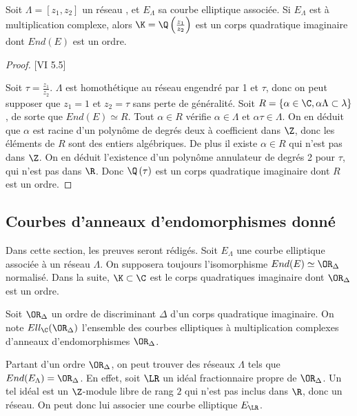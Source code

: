 \begin{Prop}
	Soit $\Lambda = \left[ z_{1}, z_{2}\right] $ un réseau , et $E_{\Lambda}$ sa courbe elliptique associée. Si $E_{\Lambda}$ est à multiplication complexe, alors $\K = \Q\left( \frac{z_1}{z_2}\right)$ est un corps quadratique imaginaire dont $End(E)$ est un ordre. 
\end{Prop}

\begin{proof}\cite{Sil09}[VI 5.5]
	
	Soit $\tau = \frac{z_1}{z_2}$. $\Lambda$ est homothétique au réseau engendré par 1 et $\tau$, donc on peut supposer que $z_1 = 1$ et $z_2 = \tau$ sans perte de généralité. Soit $R =  \left\lbrace\alpha\in\C, \alpha\Lambda\subset\lambda\right\rbrace$, de sorte que $End(E)\simeq R$. Tout $\alpha\in R$ vérifie $\alpha\in\Lambda$ et $\alpha\tau\in\Lambda$. On en déduit que $\alpha$ est racine d'un polynôme de degrés deux à coefficient dans $\Z$, donc les éléments de $R$ sont des entiers algébriques. De plus il existe $\alpha\in R$ qui n'est pas dans $\Z$. On en déduit l'existence d'un polynôme annulateur de degrés 2 pour $\tau$, qui n'est pas dans $\R$. Donc $\Q\left(\tau\right)$ est un corps quadratique imaginaire dont $R$ est un ordre. 
\end{proof}








\subsection{Courbes d'anneaux d'endomorphismes donné}

Dans cette section, les preuves seront rédigés. Soit $E_{\Lambda}$ une courbe elliptique associée à un réseau $\Lambda$.  On supposera toujours l'isomorphisme $End(E)\simeq\OR_{\Delta}$ normalisé. Dans la suite, $\K\subset\C$ est le corps quadratiques imaginaire dont $\OR_{\Delta}$ est un ordre.

\begin{Def}
	Soit $\OR_{\Delta}$ un ordre de discriminant $\Delta$ d'un corps quadratique imaginaire. On note $Ell_{\C}(\OR_{\Delta})$ l'ensemble des courbes elliptiques à multiplication complexes d'anneaux d'endomorphismes $\OR_{\Delta}$. 
\end{Def}

Partant d'un ordre $\OR_{\Delta}$, on peut trouver des réseaux $\Lambda$ tels que $End(E_{\Lambda}) = \OR_{\Delta}$. En effet, soit $\LR$ un idéal fractionnaire propre de $\OR_{\Delta}$. Un tel idéal est un $\Z$-module libre de rang $2$ qui n'est pas inclus dans $\R$, donc un réseau. On peut donc lui associer une courbe elliptique $E_{\LR}$.

